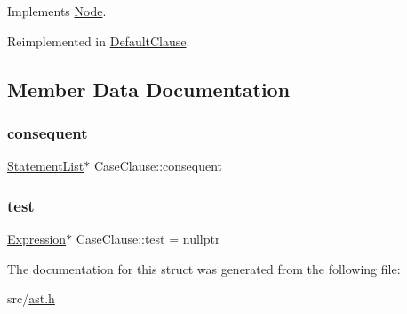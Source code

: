 Implements \hyperlink{struct_node_a82f29420d0a38efcc370352528e94e9b}{Node}.



Reimplemented in \hyperlink{struct_default_clause_a464358dcd7e4e13287482d3c858f3538}{Default\+Clause}.



\subsection{Member Data Documentation}
\mbox{\label{struct_case_clause_a3e6914411610d1893b61172521e11288}} 
\subsubsection{\texorpdfstring{consequent}{consequent}}
{\footnotesize\ttfamily \hyperlink{struct_statement_list}{Statement\+List}$\ast$ Case\+Clause\+::consequent}

\mbox{\label{struct_case_clause_a80b6f256f3d9910250e4b8433ea75d7f}} 
\subsubsection{\texorpdfstring{test}{test}}
{\footnotesize\ttfamily \hyperlink{struct_expression}{Expression}$\ast$ Case\+Clause\+::test = nullptr}



The documentation for this struct was generated from the following file\+:\begin{DoxyCompactItemize}
\item 
src/\hyperlink{ast_8h}{ast.\+h}\end{DoxyCompactItemize}
